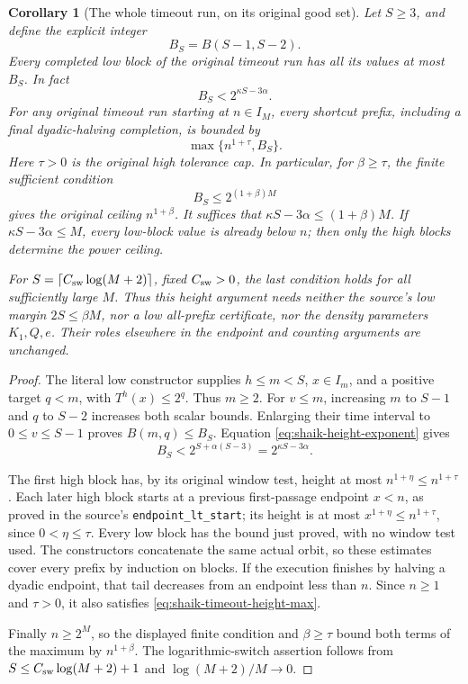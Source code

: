 \documentclass[11pt]{article}
\newtheorem{corollary}[proposition]{Corollary}
\theoremstyle{remark}\newtheorem{remark}[proposition]{Remark}
\begin{document}
\begin{corollary}[The whole timeout run, on its original good set]
\label{cor:shaik-timeout-height-refinement}
Let \(S\ge3\), and define the explicit integer
\[
 B_S=B(S-1,S-2).
\]
Every completed low block of the original timeout run has all its values
at most \(B_S\). In fact
\begin{equation}\label{eq:shaik-timeout-low-height}
 B_S<2^{\kappa S-3\alpha}.
\end{equation}
For any original timeout run starting at \(n\in I_M\), every shortcut
prefix, including a final dyadic-halving completion, is bounded by
\begin{equation}\label{eq:shaik-timeout-height-max}
 \max\{n^{1+\tau},B_S\}.
\end{equation}
Here \(\tau>0\) is the original high tolerance cap. In particular, for
\(\beta\ge\tau\), the finite sufficient condition
\[
 B_S\le2^{(1+\beta)M}
\]
gives the original ceiling \(n^{1+\beta}\). It suffices that
\(\kappa S-3\alpha\le(1+\beta)M\). If
\(\kappa S-3\alpha\le M\), every low-block value is already below \(n\);
then only the high blocks determine the power ceiling.

For \(S=\lceil C_{\rm sw}\log(M+2)\rceil\), fixed \(C_{\rm sw}>0\), the
last condition holds for all sufficiently large \(M\). Thus this height
argument needs neither the source's low margin \(2S\le\beta M\), nor a
low all-prefix certificate, nor the density parameters \(K_1,Q,e\).
Their roles elsewhere in the endpoint and counting arguments are unchanged.
\end{corollary}
\begin{proof}
The literal low constructor supplies \(h\le m<S\),
\(x\in I_m\), and a positive target \(q<m\), with \(T^h(x)\le2^q\).
Thus \(m\ge2\). For \(v\le m\), increasing \(m\) to \(S-1\) and \(q\)
to \(S-2\) increases both scalar bounds. Enlarging their time interval
to \(0\le v\le S-1\) proves \(B(m,q)\le B_S\). Equation
\eqref{eq:shaik-height-exponent} gives
\[
 B_S<2^{S+\alpha(S-3)}=2^{\kappa S-3\alpha}.
\]

The first high block has, by its original window test, height at most
\(n^{1+\eta}\le n^{1+\tau}\). Each later high block starts at a previous
first-passage endpoint \(x<n\), as proved in the source's
\texttt{endpoint\_lt\_start}; its height is at most
\(x^{1+\eta}\le n^{1+\tau}\), since \(0<\eta\le\tau\).
Every low block has the bound just proved, with no window test used.
The constructors concatenate the same actual orbit, so these estimates
cover every prefix by induction on blocks. If the execution finishes
by halving a dyadic endpoint, that tail decreases from an endpoint
less than \(n\). Since \(n\ge1\) and \(\tau>0\), it also satisfies
\eqref{eq:shaik-timeout-height-max}.

Finally \(n\ge2^M\), so the displayed finite condition and \(\beta\ge\tau\)
bound both terms of the maximum by \(n^{1+\beta}\).
The logarithmic-switch assertion follows from
\(S\le C_{\rm sw}\log(M+2)+1\) and
\(\log(M+2)/M\longrightarrow0\).
\end{proof}
\end{document}
